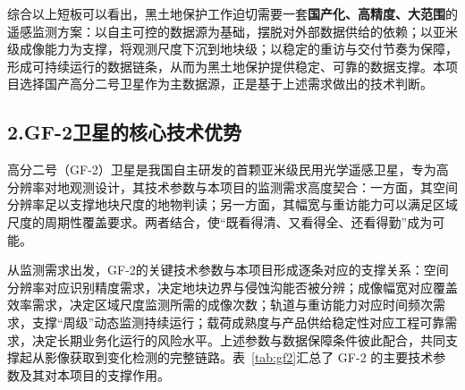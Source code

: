 \documentclass[12pt, a4paper]{ctexart}
\begin{document}
综合以上短板可以看出，黑土地保护工作迫切需要一套\textbf{国产化、高精度、大范围}的遥感监测方案：以自主可控的数据源为基础，摆脱对外部数据供给的依赖；以亚米级成像能力为支撑，将观测尺度下沉到地块级；以稳定的重访与交付节奏为保障，形成可持续运行的数据链条，从而为黑土地保护提供稳定、可靠的数据支撑。本项目选择国产高分二号卫星作为主数据源，正是基于上述需求做出的技术判断。

\subsection{2.GF-2卫星的核心技术优势}

高分二号（GF-2）卫星是我国自主研发的首颗亚米级民用光学遥感卫星，专为高分辨率对地观测设计，其技术参数与本项目的监测需求高度契合：一方面，其空间分辨率足以支撑地块尺度的地物判读；另一方面，其幅宽与重访能力可以满足区域尺度的周期性覆盖要求。两者结合，使“既看得清、又看得全、还看得勤”成为可能。

从监测需求出发，GF-2的关键技术参数与本项目形成逐条对应的支撑关系：空间分辨率对应识别精度需求，决定地块边界与侵蚀沟能否被分辨；成像幅宽对应覆盖效率需求，决定区域尺度监测所需的成像次数；轨道与重访能力对应时间频次需求，支撑“周级”动态监测持续运行；载荷成熟度与产品供给稳定性对应工程可靠需求，决定长期业务化运行的风险水平。上述参数与数据保障条件彼此配合，共同支撑起从影像获取到变化检测的完整链路。表~\ref{tab:gf2}汇总了 GF-2 的主要技术参数及其对本项目的支撑作用。
\end{document}
